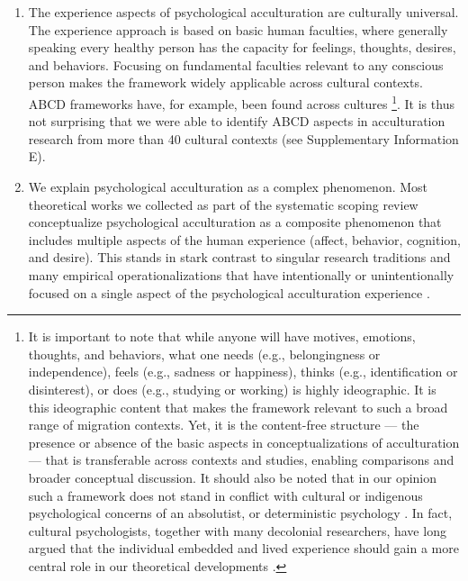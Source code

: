 \documentclass[man, 12pt, a4paper, mask]{apa7}
\begin{document}
\begin{enumerate}
\item The experience aspects of psychological acculturation are culturally universal. The experience approach is based on basic human faculties, where generally speaking every healthy person has the capacity for feelings, thoughts, desires, and behaviors. Focusing on fundamental faculties relevant to any conscious person makes the framework widely applicable across cultural contexts. ABCD frameworks have, for example, been found across cultures \citep[e.g.,][]{Bhawuk2011}\footnote{It is important to note that while anyone will have motives, emotions, thoughts, and behaviors, what one needs (e.g., belongingness or independence), feels (e.g., sadness or happiness), thinks (e.g., identification or disinterest), or does (e.g., studying or working) is highly ideographic. It is this ideographic content that makes the framework relevant to such a broad range of migration contexts. Yet, it is the content-free structure --- the presence or absence of the basic aspects in conceptualizations of acculturation --- that is transferable across contexts and studies, enabling comparisons and broader conceptual discussion. It should also be noted that in our opinion such a framework does not stand in conflict with cultural or indigenous psychological concerns of an absolutist, or deterministic psychology \citep[e.g.,][]{Kim2006a}. In fact, cultural psychologists, together with many decolonial researchers, have long argued that the individual embedded and lived experience should gain a more central role in our theoretical developments \citep[e.g., ontological turn;][]{Pedersen2020}.}. It is thus not surprising that we were able to identify ABCD aspects in acculturation research from more than 40 cultural contexts (see Supplementary Information E).

\item We explain psychological acculturation as a complex phenomenon. Most theoretical works we collected as part of the systematic scoping review conceptualize psychological acculturation as a composite phenomenon that includes multiple aspects of the human experience (affect, behavior, cognition, and desire). This stands in stark contrast to singular research traditions and many empirical operationalizations that have intentionally or unintentionally focused on a single aspect of the psychological acculturation experience \citep[also see][]{Ward2001}.
\end{enumerate}
\end{document}

